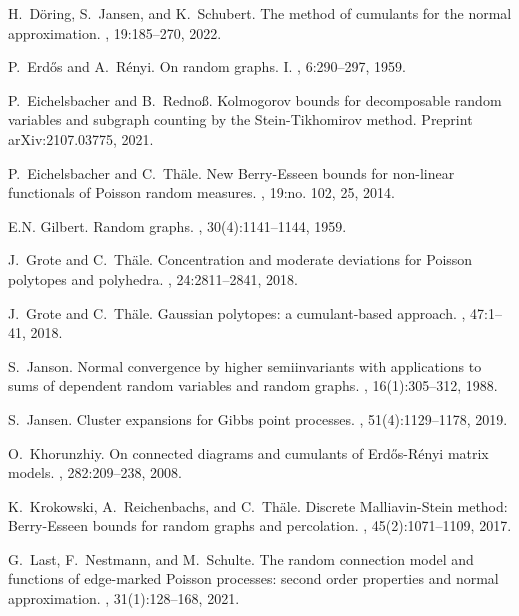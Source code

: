 \documentclass[12pt]{article}
\let\Horig\H
\numberwithin{equation}{section}
\begin{document}
\begin{thebibliography}{BRSW17}
H.~D{\"o}ring, S.~Jansen, and K.~Schubert.
\newblock The method of cumulants for the normal approximation.
, 19:185--270, 2022.

P.~Erd{\Horig{o}}s and A.~R\'enyi.
\newblock On random graphs. {I}.
, 6:290--297, 1959.

P.~Eichelsbacher and B.~Redno{\ss}.
\newblock Kolmogorov bounds for decomposable random variables and subgraph
  counting by the {S}tein-{T}ikhomirov method.
\newblock Preprint arXiv:2107.03775, 2021.

P.~Eichelsbacher and C.~Th{\"a}le.
\newblock New {B}erry-{E}sseen bounds for non-linear functionals of {P}oisson
  random measures.
, 19:no. 102, 25, 2014.

E.N. Gilbert.
\newblock Random graphs.
, 30(4):1141--1144, 1959.

J.~Grote and C.~Th{\"a}le.
\newblock Concentration and moderate deviations for {P}oisson polytopes and
  polyhedra.
, 24:2811--2841, 2018.

J.~Grote and C.~Th{\"a}le.
\newblock Gaussian polytopes: a cumulant-based approach.
, 47:1--41, 2018.

S.~Janson.
\newblock Normal convergence by higher semiinvariants with applications to sums
  of dependent random variables and random graphs.
, 16(1):305--312, 1988.

S.~Jansen.
\newblock Cluster expansions for {G}ibbs point processes.
, 51(4):1129--1178, 2019.

O.~Khorunzhiy.
\newblock On connected diagrams and cumulants of {E}rd{\Horig{o}}s-{R}\'enyi
  matrix models.
, 282:209--238, 2008.

K.~Krokowski, A.~Reichenbachs, and C.~Th{\"a}le.
\newblock Discrete {M}alliavin-{S}tein method: {B}erry-{E}sseen bounds for
  random graphs and percolation.
, 45(2):1071--1109, 2017.

G.~Last, F.~Nestmann, and M.~Schulte.
\newblock The random connection model and functions of edge-marked {P}oisson
  processes: second order properties and normal approximation.
, 31(1):128--168, 2021.


\end{thebibliography}
\end{document}
